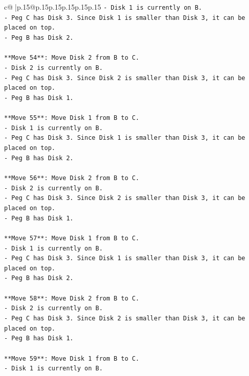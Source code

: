\documentclass{article}
\begin{document}
{\begin{supertabular}{c@{$\;$}|p{.15\linewidth}@{}p{.15\linewidth}p{.15\linewidth}p{.15\linewidth}p{.15\linewidth}p{.15\linewidth}}
{{{\texttt{{-} Disk 1 is currently on B.} \\
\texttt{{-} Peg C has Disk 3. Since Disk 1 is smaller than Disk 3, it can be placed on top.} \\
\texttt{{-} Peg B has Disk 2.} \\
\\ 
\texttt{**Move 54**: Move Disk 2 from B to C.} \\
\texttt{{-} Disk 2 is currently on B.} \\
\texttt{{-} Peg C has Disk 3. Since Disk 2 is smaller than Disk 3, it can be placed on top.} \\
\texttt{{-} Peg B has Disk 1.} \\
\\ 
\texttt{**Move 55**: Move Disk 1 from B to C.} \\
\texttt{{-} Disk 1 is currently on B.} \\
\texttt{{-} Peg C has Disk 3. Since Disk 1 is smaller than Disk 3, it can be placed on top.} \\
\texttt{{-} Peg B has Disk 2.} \\
\\ 
\texttt{**Move 56**: Move Disk 2 from B to C.} \\
\texttt{{-} Disk 2 is currently on B.} \\
\texttt{{-} Peg C has Disk 3. Since Disk 2 is smaller than Disk 3, it can be placed on top.} \\
\texttt{{-} Peg B has Disk 1.} \\
\\ 
\texttt{**Move 57**: Move Disk 1 from B to C.} \\
\texttt{{-} Disk 1 is currently on B.} \\
\texttt{{-} Peg C has Disk 3. Since Disk 1 is smaller than Disk 3, it can be placed on top.} \\
\texttt{{-} Peg B has Disk 2.} \\
\\ 
\texttt{**Move 58**: Move Disk 2 from B to C.} \\
\texttt{{-} Disk 2 is currently on B.} \\
\texttt{{-} Peg C has Disk 3. Since Disk 2 is smaller than Disk 3, it can be placed on top.} \\
\texttt{{-} Peg B has Disk 1.} \\
\\ 
\texttt{**Move 59**: Move Disk 1 from B to C.} \\
\texttt{{-} Disk 1 is currently on B.} \\
}}}
\end{supertabular}}
\end{document}
